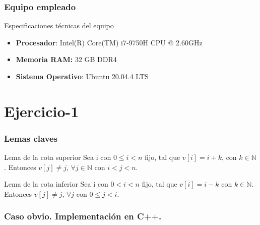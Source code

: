 \documentclass[13pt]{beamer}
\begin{document}
    \begin{frame}
        \frametitle{Equipo empleado}

        \begin{block}{Especificaciones técnicas del equipo}
            \begin{itemize}
                \item \textbf{Procesador}: Intel(R) Core(TM) i7-9750H CPU @ 2.60GHz
                \item \textbf{Memoria RAM:} 32 GB DDR4
                \item \textbf{Sistema Operativo}: Ubuntu 20.04.4 LTS
            \end{itemize}
        \end{block}
    \end{frame}



    \section{Ejercicio-1}

    \begin{frame}
        \frametitle{Lemas claves}
            \begin{block}{Lema de la cota superior}
                \label{lem:1}
                Sea i con $0 \leqslant i < n$ fijo, tal que $v[i]=i+k$, con $k \in \mathbb N$. 
                Entonces $v[j] \neq j$, $\forall j \in \mathbb N$ con $i < j < n$. 
            \end{block}
            \begin{block}{Lema de la cota inferior}
                \label{lem:2}
                Sea i con $0 < i < n$ fijo, tal que $v[i]=i-k$ con 
                $k \in \mathbb N$. Entonces $v[j] \neq j$,  $\forall j$ con $0 \leqslant j < i$. 
            \end{block}
    \end{frame}


	 \begin{frame}
		\frametitle{Caso obvio. Implementación en C++.}
		 
	\end{frame}
\end{document}
